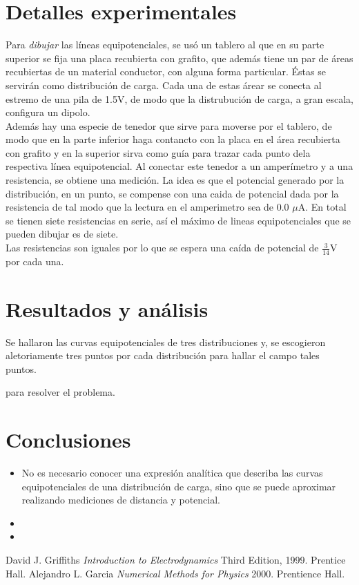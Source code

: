 \documentclass[10pt,twocolumn]{article}
\begin{document}
\section{Detalles experimentales}
Para \emph{dibujar} las líneas equipotenciales, se usó un tablero al que en su parte superior se fija una placa recubierta con grafito, que además tiene un par de áreas recubiertas de un  material conductor, con alguna forma particular. Éstas se servirán como distribución de carga. Cada una de estas árear se conecta al estremo de una pila de 1.5V, de modo que la distrubución de carga, a gran escala, configura un dipolo. \\Además hay una especie de tenedor que sirve para moverse por el tablero, de modo que en la parte inferior haga contancto con la placa en el área recubierta con grafito y en la superior sirva como guía para trazar cada punto dela respectiva línea equipotencial. Al conectar este tenedor a un amperímetro y a una resistencia, se obtiene una medición. La idea es que el potencial generado por la distribución, en un punto, se compense con una caida de potencial dada por la resistencia de tal modo que la lectura en el amperimetro sea de 0.0 $\mu{}$A. En total se tienen siete  resistencias en serie, así el máximo de lineas equipotenciales que se pueden dibujar es de siete. \\
Las resistencias son iguales por lo que se espera una caída de potencial de $\frac{3}{14}$V por cada una.
\section{Resultados y análisis}
Se hallaron las curvas equipotenciales de tres distribuciones y, se escogieron aletoriamente tres puntos por cada distribución para hallar el campo tales puntos.



\cite{problem} para resolver el problema.
\section{Conclusiones}
\begin{itemize}
\item No es necesario conocer una expresión analítica que describa las curvas equipotenciales de una distribución de carga, sino que se puede aproximar realizando mediciones de distancia y potencial.
\item 
\item 
\end{itemize}
\begin{thebibliography}{1}
   David J. Griffiths {\em Introduction to Electrodynamics} Third Edition,  1999. Prentice Hall.
    Alejandro L. Garcia {\em Numerical Methods for Physics} 2000.  Prentience Hall.
  \end{thebibliography}
\end{document}
